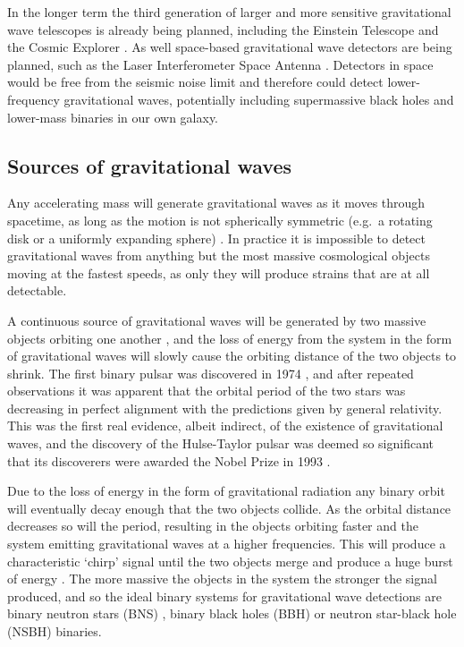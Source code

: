 \begin{colsection}
\begin{colsection}
In the longer term the third generation of larger and more sensitive gravitational wave telescopes is already being planned, including the Einstein Telescope \citep{EinsteinTelescope} and the Cosmic Explorer \citep{CosmicExplorer}. As well space-based gravitational wave detectors are being planned, such as the Laser Interferometer Space Antenna  \citep[LISA,][]{LISA}. Detectors in space would be free from the seismic noise limit and therefore could detect lower-frequency gravitational waves, potentially including supermassive black holes and lower-mass binaries in our own galaxy.

\end{colsection}

\newpage
\subsection{Sources of gravitational waves}
\label{sec:gw_sources}
\begin{colsection}

Any accelerating mass will generate gravitational waves as it moves through spacetime, as long as the motion is not spherically symmetric (e.g.\ a rotating disk or a uniformly expanding sphere) \citep{BIGcardiff,BIGparis}. In practice it is impossible to detect gravitational waves from anything but the most massive cosmological objects moving at the fastest speeds, as only they will produce strains that are at all detectable.

A continuous source of gravitational waves will be generated by two massive objects orbiting one another \citep{GW_sources}, and the loss of energy from the system in the form of gravitational waves will slowly cause the orbiting distance of the two objects to shrink. The first binary pulsar was discovered in 1974 \citep{HulseTaylor}, and after repeated observations it was apparent that the orbital period of the two stars was decreasing in perfect alignment with the predictions given by general relativity. This was the first real evidence, albeit indirect, of the existence of gravitational waves, and the discovery of the Hulse-Taylor pulsar was deemed so significant that its discoverers were awarded the Nobel Prize in 1993 \citep{HulseTaylor2}.

Due to the loss of energy in the form of gravitational radiation any binary orbit will eventually decay enough that the two objects collide. As the orbital distance decreases so will the period, resulting in the objects orbiting faster and the system emitting gravitational waves at a higher frequencies. This will produce a characteristic `chirp' signal until the two objects merge and produce a huge burst of energy \citep{GW_sources, BIGparis}. The more massive the objects in the system the stronger the signal produced, and so the ideal binary systems for gravitational wave detections are binary neutron stars (BNS) , binary black holes (BBH)  or neutron star-black hole (NSBH)  binaries.


\end{colsection}
\end{colsection}
